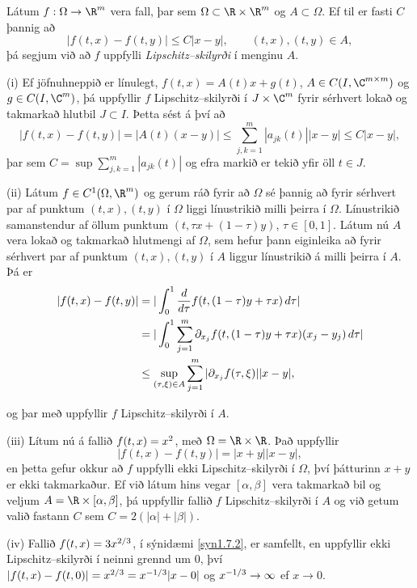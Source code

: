 \begin{sk}{}
Látum  $f:\Omega\to\R^m$ vera fall, þar sem  $\Omega\subset \R\times
\R^m$  og $A\subset \Omega$.
Ef til er fasti $C$ þannig að 
 \begin{equation*}|f(t,x)-f(t,y)|\leq C|x-y|,\qquad (t,x), (t,y)\in
 A,\label{1.7.2} 
 \end{equation*}
þá segjum við að $f$ uppfylli {\it
Lipschitz--skilyrði} í menginu $A$.
\end{sk}

\begin{sy}\label{syn1.7.4} (i) Ef jöfnuhneppið er línulegt, $f(t,x)=A(t)x+g(t)$,
$A\in C(I,\C^{m\times m})$ og $g\in C(I,\C^m)$, þá uppfyllir $f$
Lipschitz--skilyrði í $J\times \C^m$ fyrir sérhvert lokað og
takmarkað hlutbil $J\subset I$. Þetta sést á því að 
 $$|f(t,x)-f(t,y)|=|A(t)(x-y)|
\leq \sum\limits_{j,k=1}^m |a_{jk}(t)||x-y|\leq C|x-y|,
 $$
þar sem $C=\sup\sum\limits_{j,k=1}^m |a_{jk}(t)|$ 
og efra markið er tekið yfir öll $t\in J$.

\smallskip
(ii)  Látum $f\in C^{1}(\Omega,\R^m)$ og gerum ráð fyrir að $\Omega$ sé
þannig að fyrir sérhvert par af 
punktum $(t,x), (t,y)$ í $\Omega$  liggi línustrikið milli þeirra í $\Omega$.
Línustrikið  samanstendur af öllum punktum $(t,\tau x+(1-\tau)y)$,
$\tau\in [0,1]$. Látum nú $A$ vera lokað og takmarkað hlutmengi af
$\Omega$, sem hefur þann eiginleika að fyrir sérhvert par af punktum
$(t,x), (t,y)$ í $A$ liggur línustrikið á milli þeirra í $A$.  Þá er
\begin{align*}
|f(t,x)-f(t,y)|&=|\int_0\sp 1\dfrac d{d\tau}f(t,(1-\tau)y+\tau x) \,
d\tau|\\
&=|\int_0\sp 1 \sum\limits_{j=1}\sp m
\partial_{x_j}f(t,(1-\tau)y+\tau x)
(x_j-y_j) \, d\tau|\\
&\leq \sup\limits_{(\tau,\xi)\in A} 
\sum\limits_{j=1}\sp m |\partial_{x_j}f(\tau,\xi)||x-y|,
\end{align*}

\noindent
og þar með uppfyllir $f$ Lipschitz--skilyrði í $A$.

\smallskip
(iii)  Lítum nú á fallið $f(t,x)=x\sp 2$, með $\Omega=\R\times \R$.
Það uppfyllir  $$|f(t,x)-f(t,y)|=|x+y||x-y|, 
 $$
en þetta gefur okkur að $f$ uppfylli ekki Lipschitz--skilyrði í $\Omega$, því
þátturinn $x+y$ er ekki takmarkaður.  Ef við látum hins vegar
$[\alpha,\beta]$ 
vera takmarkað bil og veljum $A=\R\times [\alpha,\beta]$, þá
uppfyllir fallið $f$ Lipschitz--skilyrði í $A$ og við getum valið
fastann $C$ sem 
$C=2(|\alpha|+|\beta|)$.  

\smallskip
(iv) Fallið $f(t,x)=3x\sp{2/3}$, í sýnidæmi \ref{syn1.7.2}, er samfellt, en
uppfyllir ekki
Lipschitz--skilyrði í neinni grennd um $0$, því
$|f(t,x)-f(t,0)|=x\sp{2/3}=x\sp{-1/3}|x-0|$ og $x\sp{-1/3}\to \infty$ ef
$x\to 0$.  
\end{sy}

